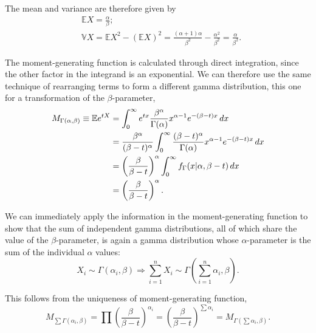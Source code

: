 \documentclass[12pt, twoside, draft]{article}
\begin{document}
The mean and variance are therefore given by
\begin{align}
&\mathbb{E}X = \frac{\alpha}{\beta}; \label{eq:gamma_distribution_mean}\\
&\mathbb{V}X = \mathbb{E}X^2 - (\mathbb{E}X)^2 = \frac{(\alpha + 1)\alpha}{\beta^2} - \frac{\alpha^2}{\beta^2} = \frac{\alpha}{\beta^2} \label{eq:gamma_distribution_variance}.
\end{align}

The moment-generating function is calculated through direct integration, since the other factor in the integrand is an exponential.  We can therefore use the same technique of rearranging terms to form a different gamma distribution, this one for a transformation of the $\beta$-parameter,
\begin{align}
M_{\Gamma(\alpha, \beta)} \equiv \mathbb{E} e^{tX} &= \int_0^\infty e^{tx} \frac{\beta^\alpha}{\Gamma(\alpha)} x^{\alpha-1} e^{-(\beta - t)x}\,dx \notag\\
&= \frac{\beta^\alpha}{(\beta - t)^\alpha} \int_0^\infty \frac{(\beta - t)^\alpha}{\Gamma(\alpha)} x^{\alpha - 1} e^{-(\beta - t)x}\,dx \notag \\
&= \left( \frac{\beta}{\beta - t} \right)^\alpha \int_0^\infty f_\Gamma (x|\alpha, \beta - t)\,dx \notag \\
&= \left( \frac{\beta}{\beta - t} \right)^\alpha.
\end{align}

We can immediately apply the information in the moment-generating function to show that the sum of independent gamma distributions, all of which share the value of the $\beta$-parameter, is again a gamma distribution whose $\alpha$-parameter is the sum of the individual $\alpha$ values:
\begin{equation}\label{eq:gamma_distribution_sum}
X_i \sim \Gamma(\alpha_i, \beta) \Rightarrow \sum_{i=1}^n X_i \sim \Gamma\left(\sum_{i=1}^n \alpha_i,\beta \right).
\end{equation}

This follows from the uniqueness of moment-generating function,
\begin{equation}
M_{\sum \Gamma(\alpha_i,\beta)} = \prod \left( \frac{\beta}{\beta - t} \right)^{\alpha_i} =  \left( \frac{\beta}{\beta - t} \right)^{\sum \alpha_i} = M_{ \Gamma(\sum\alpha_i,\beta)}.
\end{equation}
\end{document}
